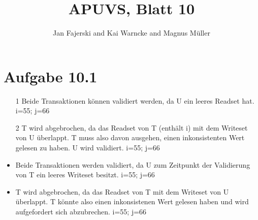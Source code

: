 \documentclass[a4paper,
12pt,
BCOR12mm,
]{scrartcl}
\title{APUVS, Blatt 10}
\author{Jan Fajerski and Kai Warncke and Magnus Müller}
\theoremstyle{break}
\begin{document}

\maketitle 

\section*{Aufgabe 10.1}
\begin{itemize}
  \item[1] Beide Transaktionen können validiert werden, da U ein leeres Readset
    hat. i=55; j=66
  \item[2] T wird abgebrochen, da das Readset von T (enthält i) mit dem Writeset
    von U überlappt. T muss also davon ausgehen, einen inkonsistenten Wert
    gelesen zu haben. U wird validiert. i=55; j=66
  \item Beide Transaktionen werden validiert, da U zum Zeitpunkt der Validierung
    von T ein leeres Writeset besitzt. i=55; j=66
  \item T wird abgebrochen, da das Readset von T mit dem Writeset von U
    überlappt. T könnte also einen inkonsistenen Wert gelesen haben und wird
    aufgefordert sich abzubrechen. i=55; j=66
\end{itemize}
\end{document}
